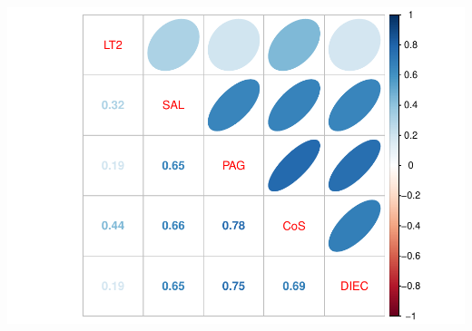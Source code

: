 \documentclass[
]{article}
\begin{document}
\includegraphics{Kaufman_McNeill_ENV797_Project_files/figure-latex/correlation plots-2.pdf}
\end{document}
